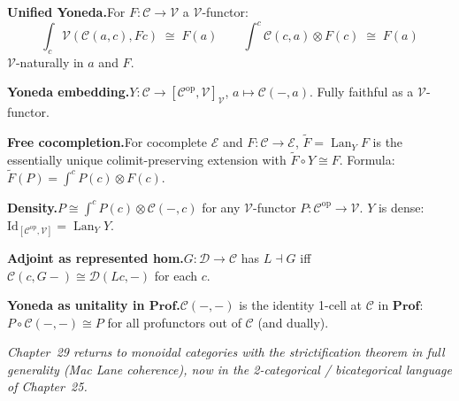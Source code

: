 \begin{formalrestatement}
\textbf{Unified Yoneda.}\quad For $F : \mathcal{C} \to \mathcal{V}$ a
$\mathcal{V}$-functor:
\[
  \int_c \mathcal{V}(\mathcal{C}(a, c), F c) \;\cong\; F(a)
  \qquad
  \int^c \mathcal{C}(c, a) \otimes F(c) \;\cong\; F(a)
\]
$\mathcal{V}$-naturally in $a$ and $F$.

\medskip
\textbf{Yoneda embedding.}\quad $Y : \mathcal{C} \to [\mathcal{C}^{\mathrm{op}},
\mathcal{V}]_\mathcal{V}$, $a \mapsto \mathcal{C}(-, a)$. Fully faithful as a
$\mathcal{V}$-functor.

\medskip
\textbf{Free cocompletion.}\quad For cocomplete $\mathcal{E}$ and $F :
\mathcal{C} \to \mathcal{E}$, $\widetilde F = \operatorname{Lan}_Y F$ is the
essentially unique colimit-preserving extension with $\widetilde F \circ Y
\cong F$. Formula: $\widetilde F(P) = \int^c P(c) \otimes F(c)$.

\medskip
\textbf{Density.}\quad $P \cong \int^c P(c) \otimes \mathcal{C}(-, c)$ for
any $\mathcal{V}$-functor $P : \mathcal{C}^{\mathrm{op}} \to \mathcal{V}$.
$Y$ is dense: $\mathrm{Id}_{[\mathcal{C}^{\mathrm{op}}, \mathcal{V}]} =
\operatorname{Lan}_Y Y$.

\medskip
\textbf{Adjoint as represented hom.}\quad $G : \mathcal{D} \to \mathcal{C}$
has $L \dashv G$ iff $\mathcal{C}(c, G-) \cong \mathcal{D}(L c, -)$ for each $c$.

\medskip
\textbf{Yoneda as unitality in $\mathbf{Prof}$.}\quad $\mathcal{C}(-, -)$ is
the identity 1-cell at $\mathcal{C}$ in $\mathbf{Prof}$: $P \circ \mathcal{C}(-,-)
\cong P$ for all profunctors out of $\mathcal{C}$ (and dually).

\medskip
\noindent\textit{Chapter~29 returns to monoidal categories with the
strictification theorem in full generality (Mac Lane coherence), now in the
2-categorical / bicategorical language of Chapter~25.}
\end{formalrestatement}
